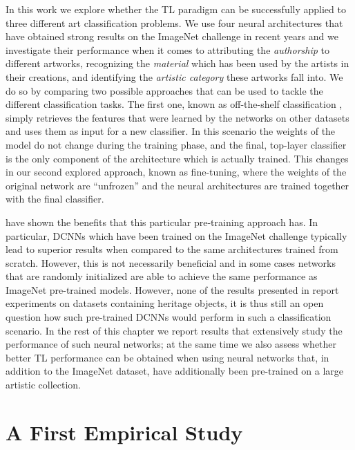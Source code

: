 In this work we explore whether the TL paradigm can be successfully applied to three different art classification problems. We use four neural architectures that have obtained strong results on the ImageNet challenge in recent years and we investigate their performance when it comes to attributing the \textit{authorship} to different artworks, recognizing the \textit{material} which has been used by the artists in their creations, and identifying the \textit{artistic category} these artworks fall into. We do so by comparing two possible approaches that can be used to tackle the different classification tasks. The first one, known as off-the-shelf classification \cite{razavian2014cnn}, simply retrieves the features that were learned by the networks on other datasets and uses them as input for a new classifier. In this scenario the weights of the model do not change during the training phase, and the final, top-layer classifier is the only component of the architecture which is actually trained. This changes in our second explored approach, known as fine-tuning, where the weights of the original network are ``unfrozen'' and the neural architectures are trained together with the final classifier. 

\citet{kornblith2018better} have shown the benefits that this particular pre-training approach has. In particular, DCNNs which have been trained on the ImageNet challenge typically lead to superior results when compared to the same architectures trained from scratch. However, this is not necessarily beneficial and in some cases networks that are randomly initialized are able to achieve the same performance as ImageNet pre-trained models. However, none of the results presented in \cite{kornblith2018better} report experiments on datasets containing heritage objects, it is thus still an open question how such pre-trained DCNNs would perform in such a classification scenario. In the rest of this chapter we report results that extensively study the performance of such neural networks; at the same time we also assess whether better TL performance can be obtained when using neural networks that, in addition to the ImageNet dataset, have additionally been pre-trained on a large artistic collection.  

\fi

\section{A First Empirical Study}
\label{sec:ch_4_introduction}

